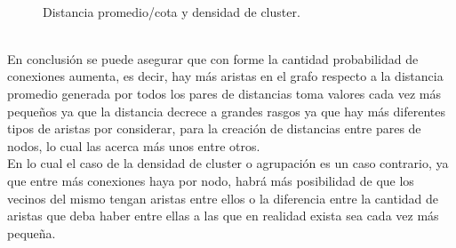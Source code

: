 \documentclass[12pt]{article}
\begin{document}
$$\begin{figure}[h]
	\caption{Distancia promedio/cota y densidad de cluster.}\label{Figura 3:}
\end{figure}\pagebreak
\\En conclusión se puede asegurar que con forme la cantidad probabilidad de conexiones aumenta, es decir, hay más aristas en el grafo respecto a la distancia promedio generada por todos los pares de distancias toma valores cada vez más pequeños ya que la distancia decrece a grandes rasgos ya que hay más diferentes tipos de aristas por considerar, para la creación de distancias entre pares de nodos, lo cual las acerca más unos entre otros.\\En lo cual el caso de la densidad de cluster o agrupación es un caso contrario, ya que entre más conexiones haya por nodo, habrá más posibilidad de que los vecinos del mismo tengan aristas entre ellos o la diferencia entre la cantidad de aristas que deba haber entre ellas a las que en realidad exista sea cada vez más pequeña.\pagebreak


\end{document}
